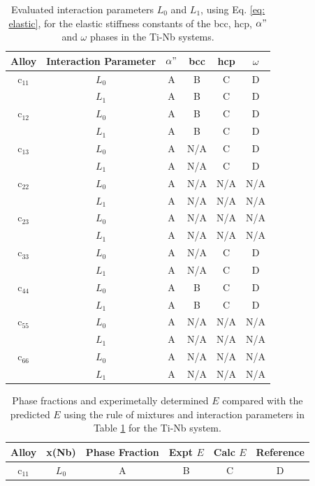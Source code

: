 \newpage
\begin{table}[H]
	\caption{Evaluated interaction parameters $L_0$ and $L_1$, using Eq. \ref{eq: elastic}, for the elastic stiffness constants of the bcc, hcp, $\alpha"$ and $\omega$ phases in the Ti-Nb systems.}
	\centering
	\begin{tabular}{ c c c c c c }
		\hline
		Alloy & Interaction Parameter & $\alpha"$ & bcc & hcp & $\omega$\\
		\hline
		c$_{11}$ & $L_{0}$ & A & B & C & D \\
		& $L_{1}$ & A & B & C & D \\
		c$_{12}$ & $L_{0}$ & A & B & C & D \\
		& $L_{1}$ & A & B & C & D \\
		c$_{13}$ & $L_{0}$ & A & N/A & C & D \\
		& $L_{1}$ & A & N/A & C & D \\
		c$_{22}$ & $L_{0}$ & A & N/A & N/A & N/A \\
		& $L_{1}$ & A & N/A & N/A & N/A \\
		c$_{23}$ & $L_{0}$ & A & N/A & N/A & N/A \\
		& $L_{1}$ & A & N/A & N/A & N/A \\
		c$_{33}$ & $L_{0}$ & A & N/A & C & D \\
		& $L_{1}$ & A & N/A & C & D \\
		c$_{44}$ & $L_{0}$ & A & B & C & D \\
		& $L_{1}$ & A & B & C & D \\
		c$_{55}$ & $L_{0}$ & A & N/A & N/A & N/A \\
		& $L_{1}$ & A & N/A & N/A & N/A \\
		c$_{66}$ & $L_{0}$ & A & N/A & N/A & N/A \\
		& $L_{1}$ & A & N/A & N/A & N/A \\
		\hline
	\end{tabular}
	\label{Ch7-table:intpara}
\end{table}
\clearpage

\newpage
\begin{table}[H]
	\caption{Phase fractions and experimetally determined $E$ compared with the predicted $E$ using the rule of mixtures and interaction parameters in Table \ref{Ch7-table:intpara} for the Ti-Nb system.}
	\centering
	\begin{tabular}{ c c c c c c }
		\hline
		Alloy & x(Nb) & Phase Fraction & Expt $E$ & Calc $E$ & Reference \\
		\hline
		c$_{11}$ & $L_{0}$ & A & B & C & D \\

		\hline
	\end{tabular}
	\label{Ch7-table:elasexptdata}
\end{table}
\clearpage

